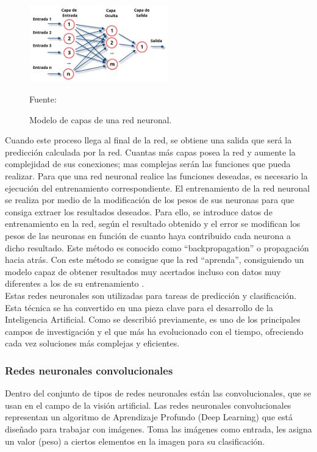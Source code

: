 \begin{figure}[H]
    \begin{center}
        \includegraphics[width=6cm]{img/capitulo_2/Redes_neuronales_esquema.png}
        \caption{Modelo de capas de una red neuronal.}
        Fuente: \cite{perceptron_multicapa}
        \label{fig:estructura_red_neuronal}
    \end{center}
\end{figure}

Cuando este proceso llega al final de la red, se obtiene una salida que será la predicción calculada por la red. Cuantas más capas posea la red y aumente la complejidad de sus conexiones; mas complejas serán las funciones que pueda realizar. Para que una red neuronal realice las funciones deseadas, es necesario la ejecución del entrenamiento correspondiente. El entrenamiento de la red neuronal se realiza por medio de la modificación de los pesos de sus neuronas para que consiga extraer los resultados deseados. Para ello, se introduce datos de entrenamiento en la red, según el resultado obtenido y el error se modifican los pesos de las neuronas en función de cuanto haya contribuido cada neurona a dicho resultado. Este método es conocido como ``backpropagation'' o propagación hacia atrás. Con este método se consigue que la red ``aprenda'', consiguiendo un modelo capaz de obtener resultados muy acertados incluso con datos muy diferentes a los de su entrenamiento \cite{atriainnovation:ia}.\\

Estas redes neuronales son utilizadas para tareas de predicción y clasificación. Esta técnica se ha convertido en una pieza clave para el desarrollo de la Inteligencia Artificial. Como se describió previamente, es uno de los principales campos de investigación y el que más ha evolucionado con el tiempo, ofreciendo cada vez soluciones más complejas y eficientes.\\

\subsubsection{Redes neuronales convolucionales}
Dentro del conjunto de tipos de redes neuronales están las convolucionales, que se usan en el campo de la visión artificial. Las redes neuronales convolucionales representan un algoritmo de Aprendizaje Profundo (Deep Learning) que está diseñado para trabajar con imágenes. Toma las imágenes como entrada, les asigna un valor (peso) a ciertos elementos en la imagen para su clasificación.\\


